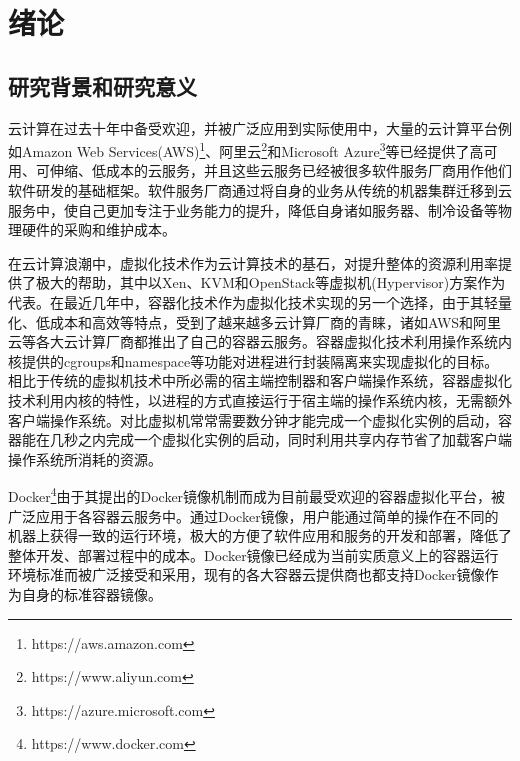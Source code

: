 
\chapter{绪论}
\label{chap:intro}

\section{研究背景和研究意义}\label{sec:intro_bg}
云计算在过去十年中备受欢迎，并被广泛应用到实际使用中，大量的云计算平台例如Amazon Web Services(AWS)\footnote{https://aws.amazon.com}、阿里云\footnote{https://www.aliyun.com}和Microsoft Azure\footnote{https://azure.microsoft.com}等已经提供了高可用、可伸缩、低成本的云服务，并且这些云服务已经被很多软件服务厂商用作他们软件研发的基础框架。软件服务厂商通过将自身的业务从传统的机器集群迁移到云服务中，使自己更加专注于业务能力的提升，降低自身诸如服务器、制冷设备等物理硬件的采购和维护成本。

在云计算浪潮中，虚拟化技术作为云计算技术的基石\cite{zhang2010cloud}，对提升整体的资源利用率提供了极大的帮助，其中以Xen\cite{barham2003xen}、KVM\cite{kivity2007kvm}和OpenStack\cite{sefraoui2012openstack}等虚拟机(Hypervisor\cite{buyya2010cloud})方案作为代表。在最近几年中，容器化技术作为虚拟化技术实现的另一个选择，由于其轻量化、低成本和高效等特点\cite{soltesz2007container}，受到了越来越多云计算厂商的青睐，诸如AWS和阿里云等各大云计算厂商都推出了自己的容器云服务。容器虚拟化技术利用操作系统内核提供的cgroups和namespace等功能对进程进行封装隔离来实现虚拟化的目标。相比于传统的虚拟机技术中所必需的宿主端控制器和客户端操作系统，容器虚拟化技术利用内核的特性，以进程的方式直接运行于宿主端的操作系统内核，无需额外客户端操作系统。对比虚拟机常常需要数分钟才能完成一个虚拟化实例的启动，容器能在几秒之内完成一个虚拟化实例的启动，同时利用共享内存节省了加载客户端操作系统所消耗的资源。

Docker\footnote{https://www.docker.com}由于其提出的Docker镜像机制而成为目前最受欢迎的容器虚拟化平台\cite{merkel2014docker}，被广泛应用于各容器云服务中。通过Docker镜像，用户能通过简单的操作在不同的机器上获得一致的运行环境，极大的方便了软件应用和服务的开发和部署，降低了整体开发、部署过程中的成本。Docker镜像已经成为当前实质意义上的容器运行环境标准而被广泛接受和采用，现有的各大容器云提供商也都支持Docker镜像作为自身的标准容器镜像。

